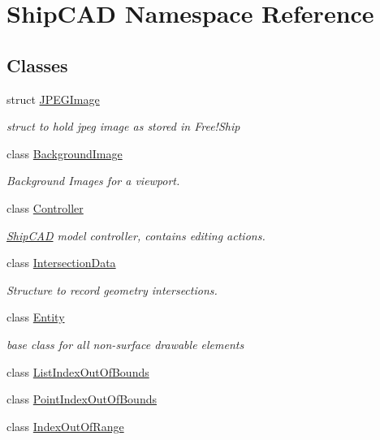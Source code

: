 \hypertarget{namespaceShipCAD}{\section{Ship\-C\-A\-D Namespace Reference}
\label{namespaceShipCAD}
}
\subsection*{Classes}
\begin{DoxyCompactItemize}
\item 
struct \hyperlink{structShipCAD_1_1JPEGImage}{J\-P\-E\-G\-Image}
\begin{DoxyCompactList}\small\item\em struct to hold jpeg image as stored in Free!\-Ship \end{DoxyCompactList}\item 
class \hyperlink{classShipCAD_1_1BackgroundImage}{Background\-Image}
\begin{DoxyCompactList}\small\item\em Background Images for a viewport. \end{DoxyCompactList}\item 
class \hyperlink{classShipCAD_1_1Controller}{Controller}
\begin{DoxyCompactList}\small\item\em \hyperlink{namespaceShipCAD}{Ship\-C\-A\-D} model controller, contains editing actions. \end{DoxyCompactList}\item 
class \hyperlink{classShipCAD_1_1IntersectionData}{Intersection\-Data}
\begin{DoxyCompactList}\small\item\em Structure to record geometry intersections. \end{DoxyCompactList}\item 
class \hyperlink{classShipCAD_1_1Entity}{Entity}
\begin{DoxyCompactList}\small\item\em base class for all non-\/surface drawable elements \end{DoxyCompactList}\item 
class \hyperlink{classShipCAD_1_1ListIndexOutOfBounds}{List\-Index\-Out\-Of\-Bounds}
\item 
class \hyperlink{classShipCAD_1_1PointIndexOutOfBounds}{Point\-Index\-Out\-Of\-Bounds}
\item 
class \hyperlink{classShipCAD_1_1IndexOutOfRange}{Index\-Out\-Of\-Range}

\end{DoxyCompactItemize}
